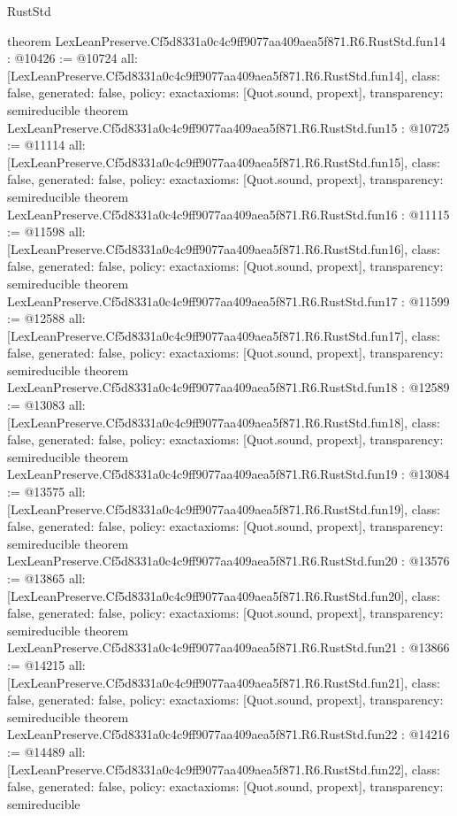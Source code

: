 \begin{lexlean}{RustStd}
\begin{coremodule}
{}
theorem LexLeanPreserve.Cf5d8331a0c4c9ff9077aa409aea5f871.R6.RustStd.fun14 : @10426 := @10724 {
  all: [LexLeanPreserve.Cf5d8331a0c4c9ff9077aa409aea5f871.R6.RustStd.fun14],
  class: false,
  generated: false,
  policy: exact{axioms: [Quot.sound, propext]},
  transparency: semireducible
}
theorem LexLeanPreserve.Cf5d8331a0c4c9ff9077aa409aea5f871.R6.RustStd.fun15 : @10725 := @11114 {
  all: [LexLeanPreserve.Cf5d8331a0c4c9ff9077aa409aea5f871.R6.RustStd.fun15],
  class: false,
  generated: false,
  policy: exact{axioms: [Quot.sound, propext]},
  transparency: semireducible
}
theorem LexLeanPreserve.Cf5d8331a0c4c9ff9077aa409aea5f871.R6.RustStd.fun16 : @11115 := @11598 {
  all: [LexLeanPreserve.Cf5d8331a0c4c9ff9077aa409aea5f871.R6.RustStd.fun16],
  class: false,
  generated: false,
  policy: exact{axioms: [Quot.sound, propext]},
  transparency: semireducible
}
theorem LexLeanPreserve.Cf5d8331a0c4c9ff9077aa409aea5f871.R6.RustStd.fun17 : @11599 := @12588 {
  all: [LexLeanPreserve.Cf5d8331a0c4c9ff9077aa409aea5f871.R6.RustStd.fun17],
  class: false,
  generated: false,
  policy: exact{axioms: [Quot.sound, propext]},
  transparency: semireducible
}
theorem LexLeanPreserve.Cf5d8331a0c4c9ff9077aa409aea5f871.R6.RustStd.fun18 : @12589 := @13083 {
  all: [LexLeanPreserve.Cf5d8331a0c4c9ff9077aa409aea5f871.R6.RustStd.fun18],
  class: false,
  generated: false,
  policy: exact{axioms: [Quot.sound, propext]},
  transparency: semireducible
}
theorem LexLeanPreserve.Cf5d8331a0c4c9ff9077aa409aea5f871.R6.RustStd.fun19 : @13084 := @13575 {
  all: [LexLeanPreserve.Cf5d8331a0c4c9ff9077aa409aea5f871.R6.RustStd.fun19],
  class: false,
  generated: false,
  policy: exact{axioms: [Quot.sound, propext]},
  transparency: semireducible
}
theorem LexLeanPreserve.Cf5d8331a0c4c9ff9077aa409aea5f871.R6.RustStd.fun20 : @13576 := @13865 {
  all: [LexLeanPreserve.Cf5d8331a0c4c9ff9077aa409aea5f871.R6.RustStd.fun20],
  class: false,
  generated: false,
  policy: exact{axioms: [Quot.sound, propext]},
  transparency: semireducible
}
theorem LexLeanPreserve.Cf5d8331a0c4c9ff9077aa409aea5f871.R6.RustStd.fun21 : @13866 := @14215 {
  all: [LexLeanPreserve.Cf5d8331a0c4c9ff9077aa409aea5f871.R6.RustStd.fun21],
  class: false,
  generated: false,
  policy: exact{axioms: [Quot.sound, propext]},
  transparency: semireducible
}
theorem LexLeanPreserve.Cf5d8331a0c4c9ff9077aa409aea5f871.R6.RustStd.fun22 : @14216 := @14489 {
  all: [LexLeanPreserve.Cf5d8331a0c4c9ff9077aa409aea5f871.R6.RustStd.fun22],
  class: false,
  generated: false,
  policy: exact{axioms: [Quot.sound, propext]},
  transparency: semireducible
}
\end{coremodule}
\end{lexlean}
